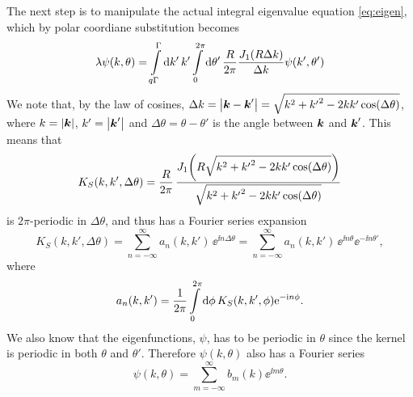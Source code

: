 \documentclass[11pt,a4paper, 
swedish,english %
]{article}
\begin{document}
The next step is to manipulate the actual integral eigenvalue equation \eqref{eq:eigen},
which by polar coordiane substitution becomes
\begin{equation}\label{eq:eigint-pol}
\lambda\psi(k, \theta) =
\int_{q\Gamma}^\Gamma\rd{k'}\,k'
\int_{0}^{2\pi}\rd\theta'\,\frac{R}{2\pi}
\frac{J_1(R\Delta{k})}{\Delta{k}} \psi(k',\theta')
\end{equation}
We note that, by the law of cosines, 
$\Delta{k}=\abs{\vb*k-\vb*k'}=\sqrt{k^2+{k'}^2-2kk'\cos(\Delta\theta)}$, 
where $k=\abs{\vb*k}$, $k'=\abs{\vb*k'}$ and
$\Delta\theta=\theta-\theta'$ is the angle between $\vb*k$ and
$\vb*k'$. This means that 
\begin{equation}\label{eq:KS-long}
K_S(k, k', \Delta\theta) = \frac{R}{2\pi}\,
\frac{J_1\qty(R\sqrt{k^2+{k'}^2-2kk'\cos(\Delta\theta)})}
{\sqrt{k^2+{k'}^2-2kk'\cos(\Delta\theta)}}
\end{equation}
is $2\pi$-periodic in $\Delta\theta$, and thus has a Fourier series expansion 
\begin{equation} \label{eq:KS-FS}
K_S(k, k', \Delta\theta)  
=\sum_{n=-\infty}^\infty a_{n}(k, k')\, \ee^{\ii n\Delta\theta}
=\sum_{n=-\infty}^\infty a_{n}(k, k')\, \ee^{\ii n\theta}\ee^{-\ii n\theta'},
\end{equation}
where 
\begin{equation}
a_{n}(k, k') = \frac{1}{2\pi} \int_0^{2\pi} \rd\phi\, 
K_S(k, k', \phi)\ee^{-\ii n\phi}.
\end{equation}
We also know that the eigenfunctions, $\psi$, has to be periodic in
$\theta$ since the kernel is periodic in both $\theta$ and
$\theta'$. Therefore $\psi(k,\theta)$ also has a Fourier series
\begin{equation}\label{eq:psi-FS}
\psi(k, \theta) = \sum_{m=-\infty}^\infty b_m(k)\ee^{\ii m\theta}.
\end{equation}
\end{document}
